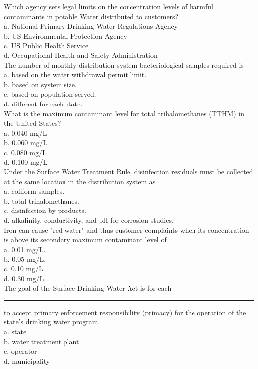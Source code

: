 Which agency sets legal limits on the concentration levels of harmful contaminants in potable Water distributed to customers?\\
a.	National Primary Drinking Water Regulations Agency\\
b.	US Environmental Protection Agency\\
c.	US Public Health Service\\
d.	Occupational Health and Safety Administration\\
The number of monthly distribution system bacteriological samples required is\\
a.	based on the water withdrawal permit limit.\\
b.	based on system size.\\
c.	based on population served.\\
d.	different for each state.\\
What is the maximum contaminant level for total trihalomethanes (TTHM) in the United States?\\
a.	0.040 mg/L\\
b.	0.060 mg/L\\
c.	0.080 mg/L\\
d.	0.100 mg/L\\
Under the Surface Water Treatment Rule, disinfection residuals must be collected at the same location in the distribution system as\\
a.	coliform samples.\\
b.	total trihalomethanes.\\
c.	disinfection by-products.\\
d.	alkalinity, conductivity, and pH for corrosion studies.\\
Iron can cause "red water" and thus customer complaints when its concentration is above its secondary maximum contaminant level of\\
a.	0.01 mg/L.\\
b.	0.05 mg/L.\\
c.	0.10 mg/L.\\
d.	0.30 mg/L.\\
The goal of the Surface Drinking Water Act is for each \rule{1.5cm}{0.1pt} to accept primary enforcement responsibility (primacy) for the operation of the state's drinking water program.\\
a.	state\\
b.	water treatment plant\\
c.	operator\\
d.	municipality\\
